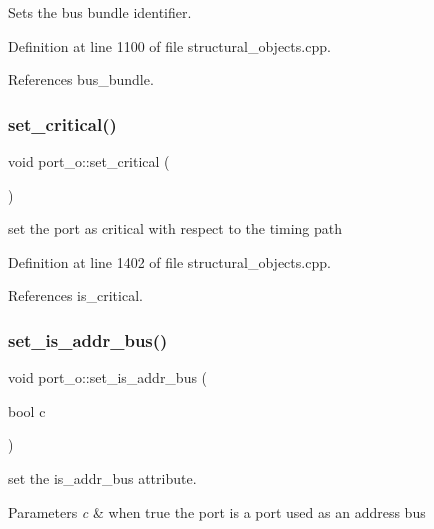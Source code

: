 Sets the bus bundle identifier. 



Definition at line 1100 of file structural\+\_\+objects.\+cpp.



References bus\+\_\+bundle.

\mbox{\label{structport__o_ace6f1d0e9d1cf5593fcdc6e5f17965de}} 
\subsubsection{\texorpdfstring{set\+\_\+critical()}{set\_critical()}}
{\footnotesize\ttfamily void port\+\_\+o\+::set\+\_\+critical (\begin{DoxyParamCaption}{ }\end{DoxyParamCaption})}



set the port as critical with respect to the timing path 



Definition at line 1402 of file structural\+\_\+objects.\+cpp.



References is\+\_\+critical.

\mbox{\label{structport__o_ae5919d0b07ba4a89838f333beb5e6a34}} 
\subsubsection{\texorpdfstring{set\+\_\+is\+\_\+addr\+\_\+bus()}{set\_is\_addr\_bus()}}
{\footnotesize\ttfamily void port\+\_\+o\+::set\+\_\+is\+\_\+addr\+\_\+bus (\begin{DoxyParamCaption}\item[{bool}]{c }\end{DoxyParamCaption})}



set the is\+\_\+addr\+\_\+bus attribute. 


\begin{DoxyParams}{Parameters}
{\em c} & when true the port is a port used as an address bus \\
\hline
\end{DoxyParams}


